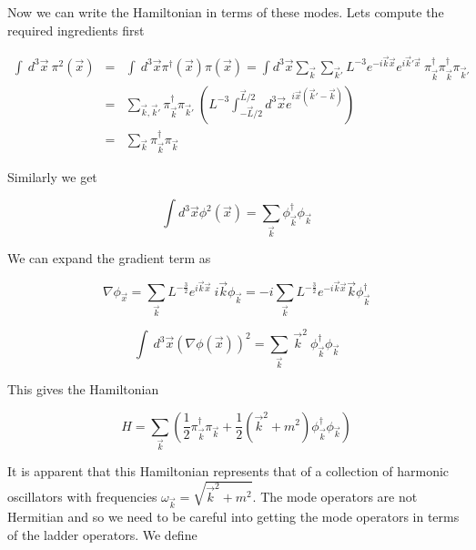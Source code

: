 \documentclass[aps,showpacs,onecolumn,floats,prd,superscriptaddress,nofootinbib]{revtex4-1}
\begin{document}
Now we can write the Hamiltonian in terms of these modes. Lets compute the required ingredients first

\begin{eqnarray}
	\int \ d^3 \vec{x} \ \pi^2(\vec{x}) & = & \int \ d^3 \vec{x} \pi^\dagger(\vec{x}) \pi(\vec{x}) = \int d^3 \vec{x} \sum_{\vec{k}} \sum_{\vec{k}'} L^{-3} e^{-i \vec{k} \vec{x}} e^{i\vec{k}' \vec{x}} \ \pi^\dagger_{\vec{k}} \pi^\dagger_{\vec{k}} \pi_{\vec{k}'}	\nonumber	\\
	& = & \sum_{\vec{k}, \vec{k}'} \pi^\dagger_{\vec{k}} \pi_{\vec{k}'} \ \left( L^{-3} \int^{\vec{L}/2}_{-\vec{L}/2} d^3 \vec{x} e^{i \vec{x}(\vec{k}' - \vec{k})} \right)	\nonumber	\\
	& = & \sum_{\vec{k}} \pi^\dagger_{\vec{k}} \pi_{\vec{k}}
\end{eqnarray} 

Similarly we get

\begin{equation}
	\int d^3 \vec{x} \phi^2 (\vec{x}) = \sum_{\vec{k}} \phi^\dagger_{\vec{k}} \phi_{\vec{k}}
\end{equation}

We can expand the gradient term as

\begin{equation}
	\nabla \phi_{\vec{x}} = \sum_{\vec{k}} L^{-\frac{3}{2}} e^{i \vec{k} \vec{x}} \ i \vec{k} \phi_{\vec{k}} = -i \sum_{\vec{k}}L^{-\frac{3}{2}} e^{-i \vec{k} \vec{x}} \vec{k} \phi^\dagger_{\vec{k}}
\end{equation}

\begin{equation}	
	\int \ d^3 \vec{x} ( \nabla \phi(\vec{x}))^2 = \sum_{\vec{k}} \ \vec{k}^2 \ \phi^\dagger_{\vec{k}} \phi_{\vec{k}}
\end{equation}

This gives the Hamiltonian

\begin{equation}
	H = \sum_{\vec{k}} \left( \frac{1}{2} \pi^\dagger_{\vec{k}} \pi_{\vec{k}} + \frac{1}{2} (\vec{k}^2 + m^2) \phi^\dagger_{\vec{k}} \phi_{\vec{k}} \right)
\end{equation}

It is apparent that this Hamiltonian represents that of a collection of harmonic oscillators with frequencies $\omega_{\vec{k}} = \sqrt{\vec{k}^2 + m^2}$. 
The mode operators are not Hermitian and so we need to be careful into getting the mode operators in terms of the ladder operators. 
We define
\end{document}

